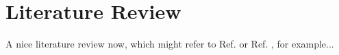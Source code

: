 \chapter{Literature Review}
\label{Literature Review}

A nice literature review now, which might refer to Ref. \cite{levin1976population} or Ref. \cite{tanaka2019recent}, for example...